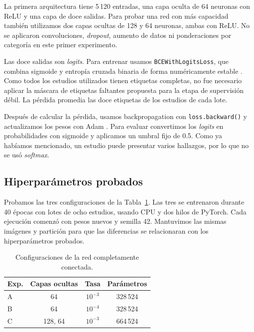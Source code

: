 \documentclass[eng]{ajceam-class}
\begin{document}
La primera arquitectura tiene 5\,120 entradas, una capa oculta de 64 neuronas con ReLU y una capa de doce salidas. Para probar una red con más capacidad también utilizamos dos capas ocultas de 128 y 64 neuronas, ambas con ReLU. No se aplicaron convoluciones, \textit{dropout}, aumento de datos ni ponderaciones por categoría en este primer experimento.

Las doce salidas son \textit{logits}. Para entrenar usamos \texttt{BCEWithLogitsLoss}, que combina sigmoide y entropía cruzada binaria de forma numéricamente estable \cite{torchbce}. Como todos los estudios utilizados tienen etiquetas completas, no fue necesario aplicar la máscara de etiquetas faltantes propuesta para la etapa de supervisión débil. La pérdida promedia las doce etiquetas de los estudios de cada lote.

Después de calcular la pérdida, usamos backpropagation con \texttt{loss.backward()} y actualizamos los pesos con Adam \cite{torchautograd,torchadam}. Para evaluar convertimos los \textit{logits} en probabilidades con sigmoide y aplicamos un umbral fijo de 0.5. Como ya habíamos mencionado, un estudio puede presentar varios hallazgos, por lo que no se usó \textit{softmax}.

\subsection{Hiperparámetros probados}

Probamos las tres configuraciones de la Tabla~\ref{tab:ff-config}. Las tres se entrenaron durante 40 épocas con lotes de ocho estudios, usando CPU y dos hilos de PyTorch. Cada ejecución comenzó con pesos nuevos y semilla 42. Mantuvimos las mismas imágenes y partición para que las diferencias se relacionaran con los hiperparámetros probados.

\begin{table}[H]
\centering
\caption{Configuraciones de la red completamente conectada.}
\label{tab:ff-config}
\small
\setlength{\tabcolsep}{4pt}
\begin{tabular}{lccc}
\hline
\textbf{Exp.} & \textbf{Capas ocultas} & \textbf{Tasa} & \textbf{Parámetros}\\
\hline
A & 64 & $10^{-3}$ & 328\,524\\
B & 64 & $10^{-4}$ & 328\,524\\
C & 128, 64 & $10^{-3}$ & 664\,524\\
\hline
\end{tabular}
\end{table}
\end{document}

